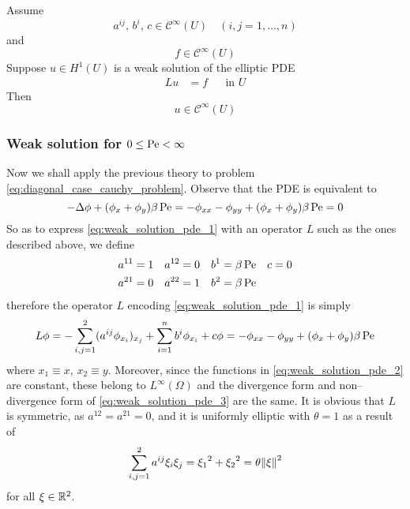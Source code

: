 \begin{theorem}
	Assume
	\[
		a^{ij}, \, b^i, \, c \in \mathcal{C}^\infty(U) \quad 
		(i,j = 1, \ldots, n)	
	\]
	and
	\[
		f \in \mathcal{C}^\infty(U)
	\]
	Suppose $u \in H^1(U)$ is a weak solution of the elliptic PDE
	\[
		\begin{aligned}
			L u &= f & &\text{in } U
		\end{aligned}	
	\]
	Then
	\[
		u \in \mathcal{C}^\infty(U)
	\]
\end{theorem}

\subsubsection*{Weak solution for \texorpdfstring{$0 \leq \mathrm{Pe} <
\infty$}{finite Péclet's number}}

Now we shall apply the previous theory to problem
\eqref{eq:diagonal_case_cauchy_problem}. Observe that the PDE is equivalent to
\begin{equation} \label{eq:weak_solution_pde_1}
	-\Delta \phi + (\phi_x + \phi_y) \beta \, \mathrm{Pe} = 
	-\phi_{xx} - \phi_{yy} + (\phi_x + \phi_y) \beta \, \mathrm{Pe} = 0
\end{equation}
So as to express \eqref{eq:weak_solution_pde_1} with an operator $L$ such as the
ones described above, we define
\begin{equation} \label{eq:weak_solution_pde_2}
	\begin{aligned}
		a^{11} &= 1 	& 	a^{12} &= 0 	& 	b^1 &= \beta \, \mathrm{Pe}	& 	c &= 0 \\
		a^{21} &= 0 	& 	a^{22} &= 1 	& 	b^2 &= \beta \, \mathrm{Pe}
	\end{aligned}
\end{equation}
therefore the operator $L$ encoding \eqref{eq:weak_solution_pde_1} is simply
\begin{equation} \label{eq:weak_solution_pde_3}
	L \phi = 
	-\sum_{i,j=1}^2 (a^{ij} \phi_{x_i})_{x_j} + \sum_{i=1}^n b^i \phi_{x_i} + c \phi =
	-\phi_{xx} - \phi_{yy} + (\phi_x + \phi_y) \beta \, \mathrm{Pe} 
\end{equation}
where $x_1 \equiv x, \, x_2 \equiv y$. Moreover, since the functions in
\eqref{eq:weak_solution_pde_2} are constant, these belong to $L^\infty(\Omega)$
and the divergence form and non--divergence form of
\eqref{eq:weak_solution_pde_3} are the same. It is obvious that $L$ is
symmetric, as $a^{12} = a^{21} = 0$, and it is uniformly elliptic with $\theta = 1$ as a result of
\begin{equation*}
	\sum_{i,j=1}^2 a^{ij} \xi_i \xi_j = 
	{\xi_1}^2 + {\xi_2}^2 = \theta \norm{\xi}^2
\end{equation*}
for all $\xi \in \mathbb{R}^2$.

